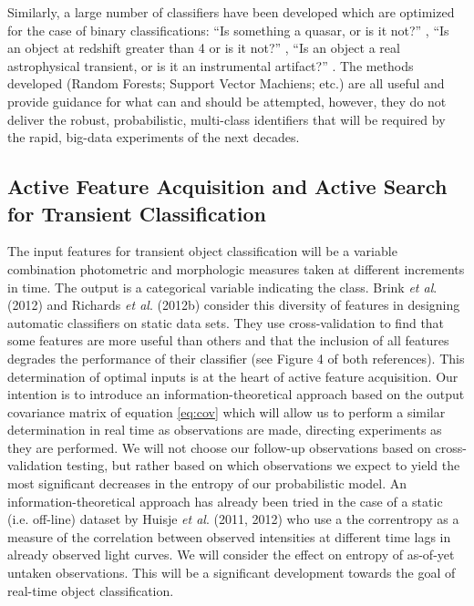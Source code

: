 \documentclass[useAMS,usenatbib,tightenlines,11pt,preprint]{aastex}
\begin{document}
Similarly, a large number of classifiers have been developed which are optimized
for the case of binary classifications: ``Is something a quasar, or is it not?''
\cite{kim2011,pichara2012}, ``Is an object at redshift greater than 4 or is it
not?'' \cite{morgan2011}, ``Is an object a real astrophysical transient, or is
it an instrumental artifact?'' \cite{brink2012}.  The methods developed
(Random Forests; Support Vector Machiens; etc.) are all useful
and provide guidance for what can and should be attempted, however, they do not
deliver the robust, probabilistic, multi-class identifiers that will be required
by the rapid, big-data experiments of the next decades.

\subsection{Active Feature Acquisition and Active Search
for Transient Classification}

The input features for transient object classification will be 
a variable combination photometric
and morphologic measures taken at different increments in time.  The output
is a categorical variable indicating the class.
Brink {\it et al}. (2012) and Richards {\it et al}. (2012b) consider this
diversity of features in designing automatic classifiers on static data sets. 
They use cross-validation to
find that some features are more useful than others and that the inclusion
of all features degrades the performance of their classifier (see Figure 4 of
both references).  This
determination of optimal inputs is at the heart of active feature
acquisition.  Our
intention is to introduce an information-theoretical approach 
based on the output covariance matrix of equation \ref{eq:cov} which will allow
us to perform a similar determination in real time as observations are made,
directing experiments as they are performed.
We will not choose our follow-up observations based on cross-validation testing,
but rather based on which observations we expect to yield the most significant
decreases in the entropy of our probabilistic model.
An information-theoretical
approach has already been tried in the case of a static (i.e. off-line)
dataset by Huisje {\it et al}. 
(2011, 2012) who use a the correntropy as a measure of the
correlation between observed intensities at different time lags in already
observed light curves.  We will consider the effect on entropy of as-of-yet
untaken observations.  This will be a significant development towards the goal
of real-time object classification.
\end{document}
